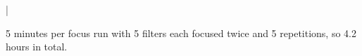|\documentclass{article}
\begin{document}
5 minutes per focus run with 5 filters each focused twice and 5 repetitions, so 4.2 hours in total.


%
%
%
%
%
%
%
%
%
%
%
%
%
%
\end{document}
